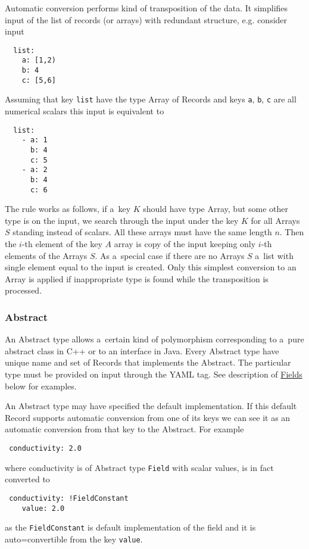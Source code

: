 Automatic conversion performs kind of transposition of the data. It simplifies input of the list of records (or arrays) 
with redundant structure, e.g. consider input
\begin{verbatim}
  list:
    a: [1,2)
    b: 4
    c: [5,6]
\end{verbatim}
Assuming that key \verb'list' have the type Array of Records and keys \verb'a', \verb'b', \verb'c' are all numerical scalars this input is equivalent to
\begin{verbatim}
  list:
    - a: 1
      b: 4
      c: 5
    - a: 2
      b: 4
      c: 6
\end{verbatim}
The rule works as follows, if a~key $K$ should have type Array, but some other type is on the input, 
we search through the input under the key $K$ for all Arrays $S$ standing instead of scalars.
All these arrays must have the same length $n$. Then the $i$-th element of the key $A$ array is
copy of the input keeping only $i$-th elements of the Arrays $S$.
As a~special case if there are no Arrays $S$ a~list with single element equal to the input is created.
Only this simplest conversion to an Array is applied if inappropriate type is found 
while the transposition is processed.





\subsubsection{Abstract}
\label{sec:abstract}
An Abstract type allows a~certain kind of polymorphism corresponding to a~pure abstract class in C++ or to an interface in Java. 
Every Abstract type have unique name and set of Records that implements the Abstract. The particular type must be provided on input through the YAML tag.
See description of \hyperlink{sec:Fields}{Fields} below for examples.

An Abstract type may have specified the default implementation. If this default Record supports automatic conversion from one of its keys
we can see it as an automatic conversion from that key to the Abstract. For example
\begin{verbatim}
 conductivity: 2.0
\end{verbatim}
where conductivity is of Abstract type \verb'Field' with scalar values, is in fact converted to
\begin{verbatim}
 conductivity: !FieldConstant
    value: 2.0
\end{verbatim}
as the \verb'FieldConstant' is default implementation of the field and it is auto=convertible from the key \verb'value'. 

